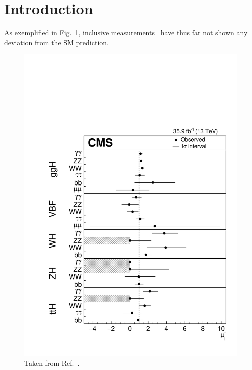 \section{Introduction}
\label{sec:introduction}




As exemplified in Fig.~\ref{fig:productiondecay}, inclusive measurements~\cite{%
Khachatryan:2016vau,%
Aad:2015zhl,%
Sirunyan:2018koj%
}
have thus far not shown any deviation from the SM prediction.
% 


\begin{figure}[hbtp]
  \begin{center}
    \includegraphics[width=0.7\linewidth]{img/theory/grandcomb/productiondecay.pdf}
    \caption{
        Taken from Ref.~\cite{Sirunyan:2018koj}.
        }
    \label{fig:productiondecay}
  \end{center}
\end{figure}


